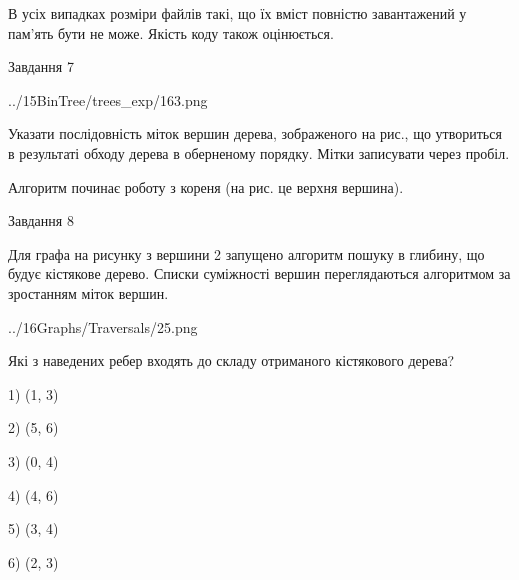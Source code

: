\documentclass[12pt, ukrainian]{article}
\begin{document}
{В усіх випадках розміри файлів такі, що їх вміст повністю завантажений у пам'ять бути не може. Якість коду також оцінюється.



\vspace{10mm}\par

\newpage
\begin{minipage}[t]{9.7cm}
               
{\begin{center}Завдання {7}\end{center}}
\vspace{-4mm}

\begin{center}
	{../15BinTree/trees_exp/163.png}
\end{center}
Указати послідовність міток вершин дерева, зображеного на рис., що утвориться в результаті обходу дерева в оберненому порядку. Мітки записувати через пробіл.\par Алгоритм починає роботу з кореня (на рис. це верхня вершина).\par

\end{minipage}
\vline \hspace{8mm}
\begin{minipage}[t]{8.0cm}
               
{\begin{center}Завдання {8}\end{center}}
\vspace{-4mm}
Для графа на рисунку з вершини 2 запущено алгоритм пошуку в глибину, що будує кістякове дерево. Списки суміжності вершин переглядаються алгоритмом за зростанням міток вершин.\par
\begin{center}
	{../16Graphs/Traversals/25.png}
\end{center}
\par Які з наведених ребер входять до складу отриманого кістякового дерева?\par
1) (1, 3)\par
2) (5, 6)\par
3) (0, 4)\par
4) (4, 6)\par
5) (3, 4)\par
6) (2, 3)\par
{\vskip 15pt} \par


\end{minipage}}
\end{document}
